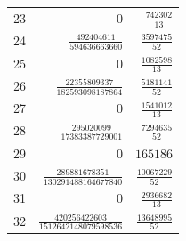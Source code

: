 \begin{longtable}{rrr}
23 & $0$ & $\frac{742302}{13}$\\
24 & $\frac{492404611}{594636663660}$ & $\frac{3597475}{52}$\\
25 & $0$ & $\frac{1082598}{13}$\\
26 & $\frac{22355809337}{182593098187864}$ & $\frac{5181141}{52}$\\
27 & $0$ & $\frac{1541012}{13}$\\
28 & $\frac{295020099}{17383387729001}$ & $\frac{7294635}{52}$\\
29 & $0$ & $165186$\\
30 & $\frac{289881678351}{130291488164677840}$ & $\frac{10067229}{52}$\\
31 & $0$ & $\frac{2936682}{13}$\\
32 & $\frac{420256422603}{1512642148079598536}$ & $\frac{13648995}{52}$\\
\end{longtable}
\endgroup
